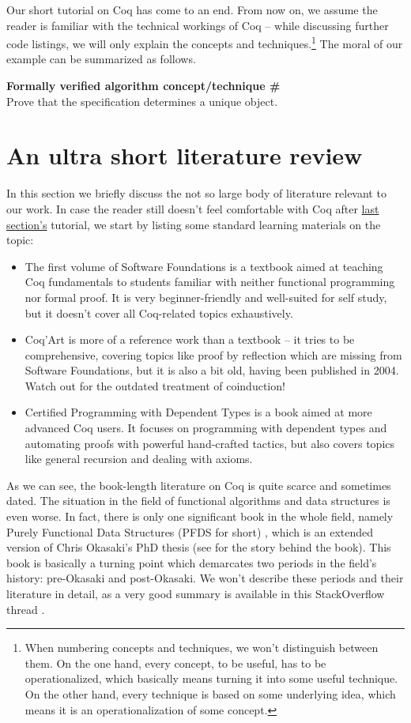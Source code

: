 \documentclass[declaration,mgr,english,shortabstract]{iithesis}
\newcounter{cnt}
\newcommand{\runcnt}{\#\arabic{cnt}}
\newcommand{\concept}[1]
{
    \refstepcounter{cnt}
    \begin{center}
        \textbf{Formally verified algorithm concept/technique \runcnt} \\
        #1
    \end{center}
}
\begin{document}
Our short tutorial on Coq has come to an end. From now on, we assume the reader is familiar with the technical workings of Coq -- while discussing further code listings, we will only explain the concepts and techniques.\footnote{When numbering concepts and techniques, we won't distinguish between them. On the one hand, every concept, to be useful, has to be operationalized, which basically means turning it into some useful technique. On the other hand, every technique is based on some underlying idea, which means it is an operationalization of some concept.} The moral of our example can be summarized as follows.

\concept{Prove that the specification determines a unique object.}

\section{An ultra short literature review} \label{literature}

In this section we briefly discuss the not so large body of literature relevant to our work. In case the reader still doesn't feel comfortable with Coq after \hyperref[coq]{last section's} tutorial, we start by listing some standard learning materials on the topic:

\begin{itemize}
    \item The first volume of Software Foundations \cite{SoftwareFoundations} is a textbook aimed at teaching Coq fundamentals to students familiar with neither functional programming nor formal proof. It is very beginner-friendly and well-suited for self study, but it doesn't cover all Coq-related topics exhaustively.
    \item Coq'Art \cite{CoqArt} is more of a reference work than a textbook -- it tries to be comprehensive, covering topics like proof by reflection which are missing from Software Foundations, but it is also a bit old, having been published in 2004. Watch out for the outdated treatment of coinduction!
    \item Certified Programming with Dependent Types \cite{CPDT} is a book aimed at more advanced Coq users. It focuses on programming with dependent types and automating proofs with powerful hand-crafted tactics, but also covers topics like general recursion and dealing with axioms.
\end{itemize}

As we can see, the book-length literature on Coq is quite scarce and sometimes dated. The situation in the field of functional algorithms and data structures is even worse. In fact, there is only one significant book in the whole field, namely Purely Functional Data Structures (PFDS for short) \cite{Okasaki}, which is an extended version of Chris Okasaki's PhD thesis \cite{OkasakiPhD} (see \cite{Okasaki10YearsLater} for the story behind the book). This book is basically a turning point which demarcates two periods in the field's history: pre-Okasaki and post-Okasaki. We won't describe these periods and their literature in detail, as a very good summary is available in this StackOverflow thread \cite{SinceOkasaki}.
\end{document}
